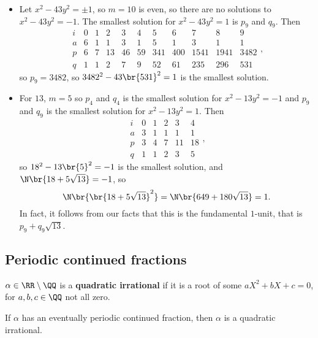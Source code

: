 \pagebreak

\begin{example*}
\hfill
\begin{itemize}
\item Let $ x^2 - 43y^2 = \pm 1 $, so $ m = 10 $ is even, so there are no solutions to $ x^2 - 43y^2 = -1 $. The smallest solution for $ x^2 - 43y^2 = 1 $ is $ p_9 $ and $ q_9 $. Then
$$
\begin{array}{c|cccccccccc}
i & 0 & 1 & 2 & 3 & 4 & 5 & 6 & 7 & 8 & 9 \\
\hline
a & 6 & 1 & 1 & 3 & 1 & 5 & 1 & 3 & 1 & 1 \\
p & 6 & 7 & 13 & 46 & 59 & 341 & 400 & 1541 & 1941 & 3482 \\
q & 1 & 1 & 2 & 7 & 9 & 52 & 61 & 235 & 296 & 531
\end{array},
$$
so $ p_9 = 3482 $, so $ 3482^2 - 43\br{531}^2 = 1 $ is the smallest solution.
\item For $ 13 $, $ m = 5 $ so $ p_4 $ and $ q_4 $ is the smallest solution for $ x^2 - 13y^2 = -1 $ and $ p_9 $ and $ q_9 $ is the smallest solution for $ x^2 - 13y^2 = 1 $. Then
$$
\begin{array}{c|ccccc}
i & 0 & 1 & 2 & 3 & 4 \\
\hline
a & 3 & 1 & 1 & 1 & 1 \\
p & 3 & 4 & 7 & 11 & 18 \\
q & 1 & 1 & 2 & 3 & 5
\end{array},
$$
so $ 18^2 - 13\br{5}^2 = -1 $ is the smallest solution, and $ \N\br{18 + 5\sqrt{13}} = -1 $, so
$$ \N\br{\br{18 + 5\sqrt{13}}^2} = \N\br{649 + 180\sqrt{13}} = 1. $$
In fact, it follows from our facts that this is the fundamental $ 1 $-unit, that is $ p_9 + q_9\sqrt{13} $.
\end{itemize}
\end{example*}

\subsection{Periodic continued fractions}


\begin{definition}
$ \alpha \in \RR \setminus \QQ $ is a \textbf{quadratic irrational} if it is a root of some $ aX^2 + bX + c = 0 $, for $ a, b, c \in \QQ $ not all zero.
\end{definition}

\begin{proposition}
If $ \alpha $ has an eventually periodic continued fraction, then $ \alpha $ is a quadratic irrational.
\end{proposition}

